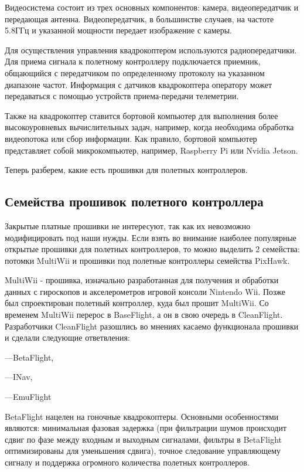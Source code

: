Видеосистема состоит из трех основных компонентов: камера, видеопередатчик и передающая антенна. Видеопередатчик, в большинстве случаев, на частоте 5.8ГГц и указанной мощности передает изображение с камеры.

Для осуществления управления квадрокоптером используются радиопередатчики. Для приема сигнала к полетному контроллеру подключается приемник, общающийся с передатчиком по определенному протоколу на указанном диапазоне частот. Информация с датчиков квадрокоптера оператору может передаваться с помощью устройств приема-передачи телеметрии.

Также на квадрокоптер ставится бортовой компьютер для выполнения более высокоуровневых вычислительных задач, например, когда необходима обработка видеопотока или сбор информации. Как правило, бортовой компьютер представляет собой микрокомпьютер, например, Ras\-pber\-ry Pi или Nvi\-dia Jet\-son. 

Теперь разберем, какие есть прошивки для полетных контроллеров.

\subsection{Семейства прошивок полетного контроллера}
Закрытые платные прошивки не интересуют, так как их невозможно модифицировать под наши нужды. Если взять во внимание наиболее популярные открытые прошивки для полетных контроллеров, то можно выделить 2 семейства: потомки MultiWii и прошивки под полетные контроллеры семейства PixHawk.

MultiWii - прошивка, изначально разработанная для получения и обработки данных с гироскопов и акселерометров игровой консоли Nintendo Wii. Позже был спроектирован полетный контроллер, куда был прошит MultiWii. Со временем MultiWii перерос в BaseFlight, а он в свою очередь в CleanFlight. Разработчики CleanFlight разошлись во мнениях касаемо функционала прошивки и сделали следующие ответвления:

---BetaFlight,

---INav,

---EmuFlight

BetaFlight нацелен на гоночные квадрокоптеры. Основными особенностями являются: минимальная фазовая задержка (при фильтрации шумов происходит сдвиг по фазе между входным и выходным сигналами, фильтры в BetaFlight оптимизированы для уменьшения сдвига), точное следование управляющему сигналу и поддержка огромного количества полетных контроллеров.

